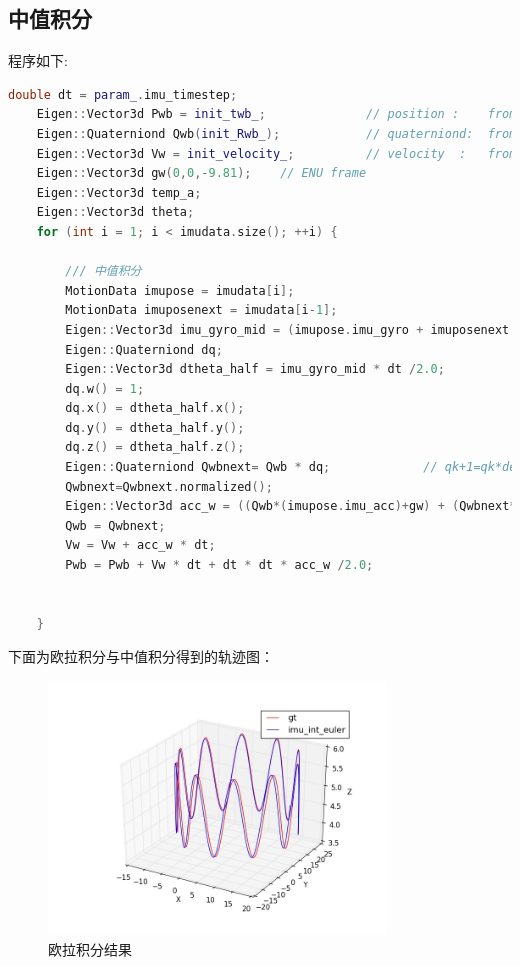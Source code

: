 \documentclass[UTF8]{ctexart}
\begin{document}
\subsection{中值积分}
\indent 程序如下:\\
\begin{lstlisting}[language={c++}]
    double dt = param_.imu_timestep;
    Eigen::Vector3d Pwb = init_twb_;              // position :    from  imu measurements
    Eigen::Quaterniond Qwb(init_Rwb_);            // quaterniond:  from imu measurements
    Eigen::Vector3d Vw = init_velocity_;          // velocity  :   from imu measurements
    Eigen::Vector3d gw(0,0,-9.81);    // ENU frame
    Eigen::Vector3d temp_a;
    Eigen::Vector3d theta;
    for (int i = 1; i < imudata.size(); ++i) {

        /// 中值积分
        MotionData imupose = imudata[i];
        MotionData imuposenext = imudata[i-1];
        Eigen::Vector3d imu_gyro_mid = (imupose.imu_gyro + imuposenext.imu_gyro) / 2.0;       //w=1/2(wk-wk_biase+wk+1-wk+1_bias)
        Eigen::Quaterniond dq;
        Eigen::Vector3d dtheta_half = imu_gyro_mid * dt /2.0;
        dq.w() = 1;
        dq.x() = dtheta_half.x();
        dq.y() = dtheta_half.y();
        dq.z() = dtheta_half.z();
        Eigen::Quaterniond Qwbnext= Qwb * dq;             // qk+1=qk*deltaq
        Qwbnext=Qwbnext.normalized();
        Eigen::Vector3d acc_w = ((Qwb*(imupose.imu_acc)+gw) + (Qwbnext*(imuposenext.imu_acc)+gw)) /2.0;    //aw = ((Rkwb * ( acck_body - acck_bias ) + gw)+(Rk+1wb * ( acck+!_body - acck+1_bias ) + gw))/2
        Qwb = Qwbnext;
        Vw = Vw + acc_w * dt;
        Pwb = Pwb + Vw * dt + dt * dt * acc_w /2.0;


    }
\end{lstlisting}
\indent 下面为欧拉积分与中值积分得到的轨迹图：
\begin{figure}[H]
\centering
\includegraphics[width=0.8\textwidth]{euler.jpg}    
\caption{欧拉积分结果}
\label{img0}
\end{figure}
\end{document}
